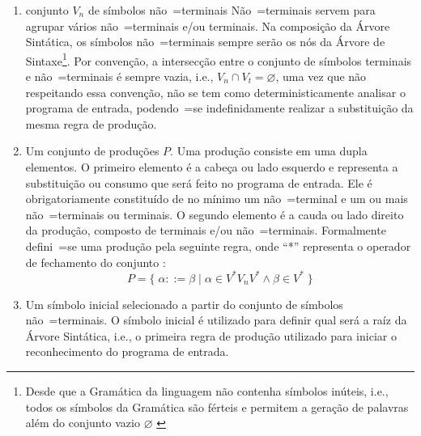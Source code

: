 {\begin{enumerate}
        \item {} conjunto $V_n$ de símbolos
        não~=terminais
        Não~=terminais servem para agrupar vários não~=terminais e\slash{}ou terminais.
        Na composição da Árvore Sintática,
        os símbolos não~=terminais sempre serão os nós da Árvore de Sintaxe\footnote{Desde
        que a Gramática da linguagem não contenha símbolos inúteis,
        i.e.,
        todos os símbolos da Gramática são férteis e
        permitem a geração de palavras além do conjunto vazio $\varnothing$ \cite{hopcroftBook}}.
        Por convenção,
        a intersecção entre o conjunto de símbolos terminais e
        não~=terminais é sempre vazia,
        i.e.,
        $V_n \cap V_t = \varnothing$,
        uma vez que não respeitando essa convenção,
        não se tem como deterministicamente analisar o programa de entrada,
        podendo~=se indefinidamente realizar a substituição da mesma regra de produção.

        \item \label{definicaoDeGramatica}Um conjunto de produções $P$.
        Uma produção consiste em uma dupla elementos.
        O primeiro elemento é a cabeça ou lado esquerdo e
        representa a substituição ou consumo que será feito no programa de entrada.
        Ele é obrigatoriamente constituído de no mínimo um não~=terminal e
        um ou mais não~=terminais ou terminais.
        O segundo elemento é a cauda ou lado direito da produção,
        composto de terminais e\slash{}ou não~=terminais.
        Formalmente defini~=se uma produção pela seguinte regra,
        onde ``*'' representa o operador de fechamento do conjunto \cite{hopcroftBook}:
        $$P = \{\; \alpha ::= \beta \;|\; \alpha \in V^* V_n V^* \land \beta \in V^* \;\}$$

        \item Um símbolo inicial selecionado a partir do conjunto de símbolos não~=terminais.
        O símbolo inicial é utilizado para definir qual será a raíz da Árvore Sintática,
        i.e.,
        o primeira regra de produção utilizado para iniciar o reconhecimento do programa de entrada.
    \end{enumerate}

}
